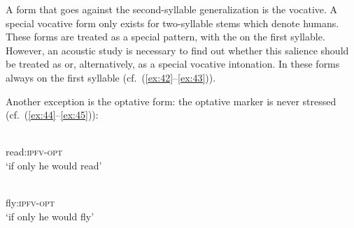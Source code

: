 \documentclass[output=paper]{langsci/langscibook}
\begin{document}
\ex %
% 
\exsameline %
\z
\z

A form that goes against the second-syllable  generalization is
the vocative. A special vocative form only exists for two-syllable stems
which denote humans. These forms are treated as a special 
pattern, with the  on the first syllable. However, an acoustic study is necessary to find out whether this salience should be treated as
 or, alternatively, as a special vocative intonation. In these
forms  always on the first syllable (cf.\ (\ref{ex:42}–\ref{ex:43})).

\ea \label{ex:42} %
\ea {}%
\exsameline %
\z

\ex \label{ex:43} %
\ea {}%
\exsameline %
\z
\z

Another exception is the optative form: the optative marker is never
stressed (cf.\ (\ref{ex:44}–\ref{ex:45})):

\ea \label{ex:44} %
\\
read:\textsc{ipfv}-\textsc{opt}\\
\glt `if only he would read'

\ex \label{ex:45} %
\\
fly:\textsc{ipfv}-\textsc{opt}\\
\glt  `if only he would fly'
\z
\end{document}
